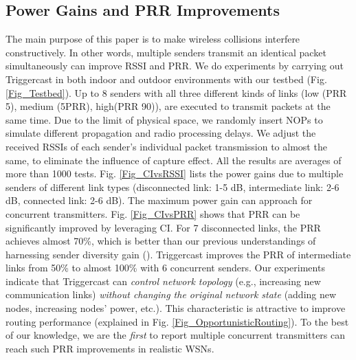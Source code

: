\documentclass[conference]{IEEEtran}
\begin{document}
\subsection{Power Gains and PRR Improvements}
\label{subsec_NEWLINK}
\indent The main purpose of this paper is to make wireless collisions interfere constructively.
In other words, multiple senders transmit an identical packet simultaneously can improve RSSI and PRR.
We do experiments by carrying out Triggercast in both indoor and outdoor environments with our testbed (Fig. \ref{Fig_Testbed}).
Up to 8 senders with all three different kinds of links (low (PRR  5), medium (5PRR), high(PRR  90)), are executed to transmit packets at the same time.
Due to the limit of physical space, we randomly insert NOPs to simulate different propagation and radio processing delays.
We adjust the received RSSIs of each sender's individual packet transmission to almost the same, to eliminate the influence of capture effect.
All the results are averages of more than 1000 tests.
Fig. \ref{Fig_CIvsRSSI} lists the power gains due to multiple senders of different link types (disconnected link: 1-5 dB, intermediate link: 2-6 dB, connected link: 2-6 dB).
The maximum power gain can approach  for  concurrent transmitters.
Fig. \ref{Fig_CIvsPRR} shows that PRR can be significantly improved by leveraging CI.
For 7 disconnected links, the PRR achieves almost 70\%, which is better than our previous understandings of harnessing sender diversity gain ().
Triggercast improves the PRR of intermediate links from 50\% to almost 100\% with 6 concurrent senders.
Our experiments indicate that Triggercast can \emph{control network topology} (e.g., increasing new communication links) \emph{without changing the original network state} (adding new nodes, increasing nodes' power, etc.).
This characteristic is attractive to improve routing performance (explained in Fig. \ref{Fig_OpportunisticRouting}).
To the best of our knowledge, we are the \emph{first} to report multiple concurrent transmitters can reach such PRR improvements in realistic WSNs.
\end{document}

